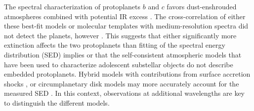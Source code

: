 \documentclass[longauth]{aa}
\newcommand{\gp}[1]{\textcolor{teal}{\textbf{GP:} #1}}
\begin{document}
   The spectral characterization of protoplanets $b$ and $c$ favors dust-enshrouded atmospheres combined with potential IR excess \citep{Muller2018, Christiaens2019a, %
   Wang2020, Stolker2020, Wang2021}. %
   The cross-correlation of either these best-fit models or molecular templates with medium-resolution spectra did not detect the planets, however
   \citep{Cugno2021}. This suggests that either significantly more extinction affects the two protoplanets than fitting of the spectral energy distribution (SED) implies or that the self-consistent atmospheric models %
   that have been used to characterize adolescent substellar objects do not describe embedded protoplanets. Hybrid models with contributions from surface accretion shocks \citep[e.g.,][]{Aoyama2020, Aoyama2021}, 
   or circumplanetary disk models may more accurately account for the measured SED \citep[e.g.,][]{%
   Chen2022}. %
   In this context, observations at additional wavelengths are key to distinguish the different models. %

   
\end{document}

